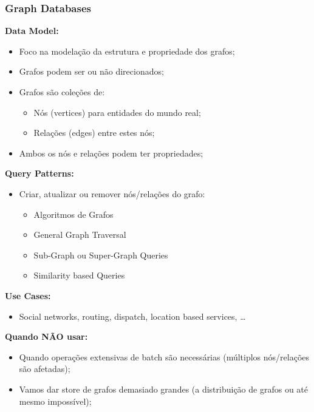 \documentclass{article}
\begin{document}
\subsubsection{Graph Databases}

\begin{flushleft}
  \textbf{Data Model:}
  \begin{itemize}
    \item Foco na modelação da estrutura e propriedade dos grafos;
    \item Grafos podem ser ou não direcionados;
    \item Grafos são coleções de:
    \begin{itemize}
      \item Nós (vertices) para entidades do mundo real;
      \item Relações (edges) entre estes nós;
    \end{itemize}
    \item Ambos os nós e relações podem ter propriedades;
  \end{itemize}

  \textbf{Query Patterns:}
  \begin{itemize}
    \item Criar, atualizar ou remover nós/relações do grafo:
    \begin{itemize}
      \item Algoritmos de Grafos
      \item General Graph Traversal
      \item Sub-Graph ou Super-Graph Queries
      \item Similarity based Queries
    \end{itemize}
  \end{itemize}

  \textbf{Use Cases:}
  \begin{itemize}
    \item Social networks, routing, dispatch, location based services, \dots
  \end{itemize}

  \textbf{Quando NÃO usar:}
  \begin{itemize}
    \item Quando operações extensivas de batch são necessárias (múltiplos nós/relações
    são afetadas);
    \item Vamos dar store de grafos demasiado grandes (a distribuição de grafos ou até mesmo impossível);
  \end{itemize}
\end{flushleft}
\end{document}
